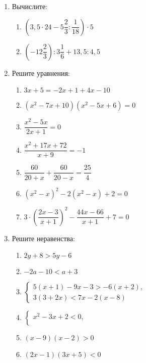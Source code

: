 \documentclass[12pt, a4paper]{article}
\begin{document}
	
	\begin{enumerate}
		\item \textit{} Вычислите:
		\begin{multicols}{2}
			\begin{enumerate}[label=\asbuk*)]
				\item $\left( 3,5 \cdot 24 - 5\dfrac{2}{3} : \dfrac{1}{18}\right) \cdot 5 $
				\item $\left( -12\dfrac{2}{3}\right):3\dfrac{1}{6} +13,5:4,5$
			\end{enumerate}
		\end{multicols}
		\item \textit{} Решите уравнения:
		\begin{multicols}{2}
			\begin{enumerate}[label=\asbuk*)]
				\item $3x+5=-2x+1+4x-10$
				\item $(x^2-7x+10)(x^2-5x+6)=0$
				\item $\dfrac{x^2-5x}{2x+1}=0$
				\item $\dfrac{x^2+17x+72}{x+9}=-1$
				\item $\dfrac{60}{20+x}+\dfrac{60}{20-x}=\dfrac{25}{4}$
				\item $(x^2-x)^2-2(x^2-x)+2=0$
				\item $3\cdot\left(\dfrac{2x-3}{x+1}\right)^2-\dfrac{44x-66}{x+1}+7=0$
			\end{enumerate}
		\end{multicols}
		\item \textit{} Решите неравенства:
		\begin{multicols}{2}
			\begin{enumerate}[label=\asbuk*)]
				\item $2y+8>5y-6$
				\item $-2a-10<a+3$
				\item $
				\left\{
				\begin{aligned}
					5(x+1)-9x-3>-6(x+2),\\
					3(3+2x)<7x-2(x-8)
				\end{aligned}
				\right.
				$
				\item $
				\left\{
				\begin{aligned}
					x^2-3x+2<0,\\
				\end{aligned}
				\right.
				$
				\item $(x-9)(x-2)>0$
				\item $(2x-1)(3x+5)<0$

\end{enumerate}
\end{multicols}
\end{enumerate}
\end{document}
